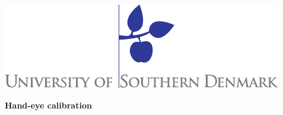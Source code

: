 \begin{titlepage}%
\begin{flushright}
\includegraphics[scale=0.73]{content/00_frontmatter/sdu_logo.pdf}
\end{flushright}
\vspace*{2.7cm}
\setlength{\extrarowheight}{0pt}
\textsf{\Huge{\textbf{\textcolor{FrontpageHeadingColor}{Hand-eye calibration}}}}\\
\vspace*{0.5cm}

\end{titlepage}
